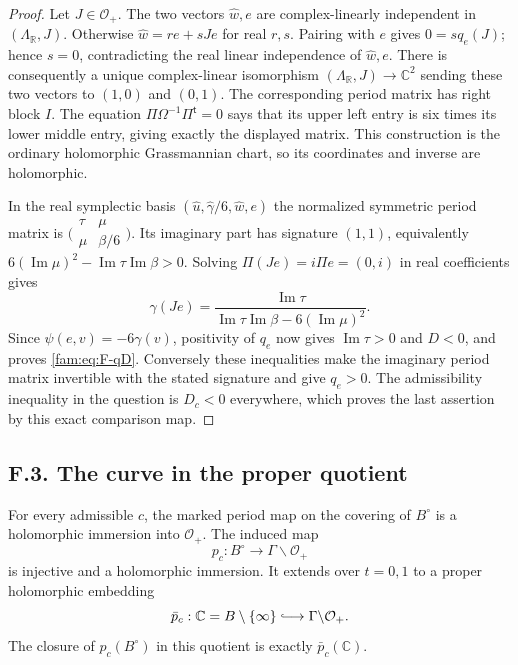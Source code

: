 \begin{proof}
Let $J\in\mathcal O_+$.  The two vectors $\widehat w,e$ are complex-linearly
independent in $(\Lambda_{\mathbb R},J)$.  Otherwise
$\widehat w=r e+sJe$ for real $r,s$.  Pairing with $e$ gives
$0=sq_e(J)$; hence $s=0$, contradicting the real linear independence
of $\widehat w,e$.  There is consequently a unique complex-linear
isomorphism $(\Lambda_{\mathbb R},J)\to\mathbb C^2$ sending these two
vectors to $(1,0)$ and $(0,1)$.  The corresponding period matrix has
right block $I$.  The equation
$\Pi\Omega^{-1}\Pi^{\mathsf t}=0$ says that its upper left entry is
six times its lower middle entry, giving exactly the displayed matrix.
This construction is the ordinary holomorphic Grassmannian chart,
so its coordinates and inverse are holomorphic.

In the real symplectic basis
$(\widehat u,\widehat\gamma/6,\widehat w,e)$ the normalized symmetric
period matrix is
$\bigl(\begin{smallmatrix}\tau&\mu\\\mu&\beta/6\end{smallmatrix}\bigr)$.
Its imaginary part has signature $(1,1)$, equivalently
$6(\operatorname{Im}\mu)^2-
\operatorname{Im}\tau\operatorname{Im}\beta>0$.
Solving $\Pi(Je)=i\Pi e=(0,i)$ in real coefficients gives
\[
 \gamma(Je)=
 \frac{\operatorname{Im}\tau}
 {\operatorname{Im}\tau\operatorname{Im}\beta-
 6(\operatorname{Im}\mu)^2}.
\]
Since $\psi(e,v)=-6\gamma(v)$, positivity of $q_e$ now gives
$\operatorname{Im}\tau>0$ and $D<0$, and proves \eqref{fam:eq:F-qD}.
Conversely these inequalities make the imaginary period matrix
invertible with the stated signature and give $q_e>0$.  The admissibility
inequality in the question is $D_c<0$ everywhere, which proves the last
assertion by this exact comparison map.
\end{proof}

\subsection{F.3. The curve in the proper quotient}

\begin{theorem}\label{fam:src:F.3.1}\label{fam:st:F.3.1}
For every admissible $c$, the marked period map on the covering of
$B^\circ$ is a holomorphic immersion into $\mathcal O_+$.  The induced
map
\[
 p_c:B^\circ\longrightarrow\Gamma\backslash\mathcal O_+
\]
is injective and a holomorphic immersion.  It extends over $t=0,1$ to a
proper holomorphic embedding
\[
 \bar p_c:\mathbb C=B\setminus\{\infty\}
 \lhook\joinrel\longrightarrow\Gamma\backslash\mathcal O_+.
\]
The closure of $p_c(B^\circ)$ in this quotient is exactly
$\bar p_c(\mathbb C)$.
\end{theorem}

